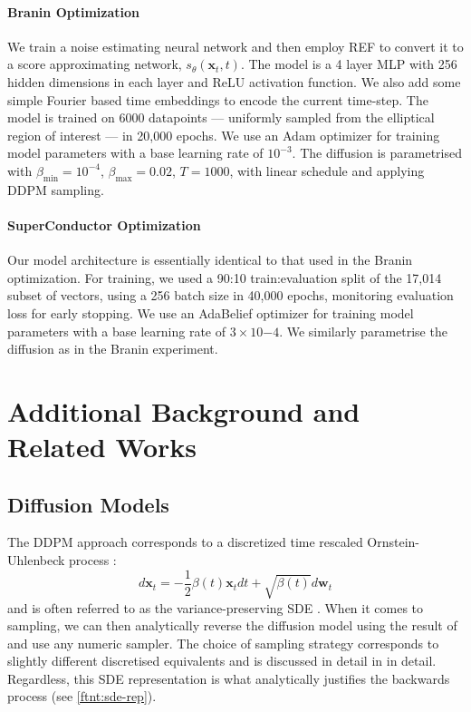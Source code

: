 \paragraph{Branin Optimization} We train a noise estimating neural network and then employ
REF to convert it to a score approximating network, $s_\theta(\mathbf{x}_t, t)$.
The model is a 4 layer MLP with 256 hidden dimensions in each layer and ReLU activation function.
We also add some simple Fourier based time embeddings to encode the current time-step. The model
is trained on 6000 datapoints --- uniformly sampled from the elliptical region of interest --- in
20,000 epochs. We use an Adam optimizer for training model parameters with a base learning rate of
$10^{-3}$. The diffusion is parametrised with $\beta_{\text{min}}=10^{-4}$,
$\beta_{\text{max}}=0.02$, $T=1000$, with linear schedule and applying DDPM sampling.

\paragraph{SuperConductor Optimization} Our model architecture is essentially identical to that used
in the Branin optimization. For training, we used a 90:10 train:evaluation split of the 17,014
subset of vectors, using a 256 batch size in 40,000 epochs, monitoring evaluation loss for early
stopping. We use an AdaBelief optimizer for training model parameters with a base learning rate of
$3\times 10{-4}$. We similarly parametrise the diffusion as in the Branin experiment.

\newpage

\section{Additional Background and Related Works} \label{sec:extra}

\subsection{Diffusion Models}

\begin{remark} \label{rem:sde-rep}
    The DDPM approach corresponds to a discretized time rescaled Ornstein-Uhlenbeck process
    \parencite{boysTweedieMomentProjected2023,songScoreBasedGenerativeModeling2021}:
    $$
    d\mathbf{x}_t = -\frac{1}{2}\beta(t)\mathbf{x}_t dt + \sqrt{\beta(t)}d\mathbf{w}_t
    $$
    and is often referred to as the variance-preserving SDE
    \parencite{songScoreBasedGenerativeModeling2021}. When it comes to sampling, we can then
    analytically reverse the diffusion model using the result of
    \textcite{andersonReversetimeDiffusionEquation1982} and use any numeric sampler. The choice
    of sampling strategy corresponds to slightly different discretised equivalents and is discussed
    in detail in \textcite{songScoreBasedGenerativeModeling2021} in detail.
    Regardless, this SDE representation is what analytically justifies the backwards process
    (see \autoref{ftnt:sde-rep}).
\end{remark}

